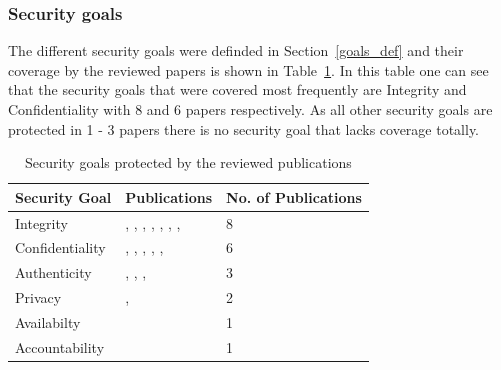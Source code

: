 \documentclass[runningheads]{llncs}
\begin{document}
\subsubsection{Security goals}\label{goals}
The different security goals were definded in Section~\ref{goals_def} and their coverage by the reviewed papers is shown in Table~\ref{goals_table}. In this table one can see that the security goals
that were covered most frequently are Integrity and Confidentiality with 8 and 6 papers respectively. As all other security goals are protected in 1 - 3 papers there is no security
goal that lacks coverage totally.
\begin{table}
    \centering
    \caption{Security goals protected by the reviewed publications}
    \begin{tabular}{ | l | l | l | }
        \hline
        \textbf{Security Goal} & \textbf{Publications}                                                                                                                                                            & \textbf{No. of Publications} \\
        \hline
        \hline
        Integrity              &\cite{Leitner2013719}, \cite{Mardani2013}, \cite{Accorsi20131462}, \cite{Mishra2018613}, \cite{MozafariMehr2022397}, \cite{Breitmayer202411}, \cite{Sarno2020}, \cite{MacAk2020} & 8                            \\
        \hline
        Confidentiality        &\cite{Leitner2013719}, \cite{Accorsi20131462}, \cite{Mishra2018613}, \cite{MozafariMehr2022397}, \cite{Breitmayer202411}, \cite{MacAk2020}                                       & 6                            \\
        \hline
        Authenticity           &\cite{Mardani2013}, \cite{Accorsi20131462}, \cite{Mishra2018613}, \cite{MozafariMehr2022397}                                                                                     & 3                            \\
        \hline
        Privacy                &\cite{Zaman20192982}, \cite{MozafariMehr202182}                                                                                                                                  & 2                            \\
        \hline
        Availabilty            &\cite{Mishra2018613}                                                                                                                                                             & 1                            \\
        \hline
        Accountability         &\cite{Mardani2013}                                                                                                                                                               & 1                            \\
        \hline
    \end{tabular}
    \label{goals_table}
\end{table}
\end{document}
